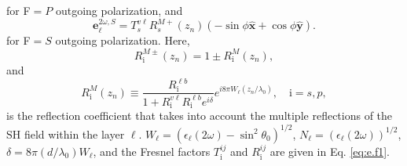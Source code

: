 \documentclass[utf8]{frontiersSCNS}
\begin{document}
for F$=P$ outgoing polarization, and
\begin{equation}\label{eq:e2wsmrn}
\mathbf{e}^{2\omega,S}_{\ell} =
T_{s}^{v\ell}R^{M+}_{s}(z_{n})
\left(
- \sin\phi\mathbf{\hat{x}}
+ \cos\phi\mathbf{\hat{y}}
\right). 
\end{equation}
for F$=S$ outgoing polarization. Here,
\begin{equation}\label{eq:n1}
R^{M\pm}_{\mathrm{i}}(z_{n}) = 1\pm R^{M}_{\mathrm{i}}(z_{n}),
\end{equation}
and
\begin{equation}\label{m61n} 
R^{M}_{\mathrm{i}}(z_{n}) \equiv
\frac{R^{\ell b}_{\mathrm{i}}}
     {1+R^{v\ell}_{\mathrm{i}} R^{\ell b}_{\mathrm{i}}e^{i\delta}} 
e^{i8\pi W_{\ell}(z_{n}/\lambda_{0})}, \quad \mathrm{i}=s,p,
\end{equation} 
is the reflection coefficient that takes into account the multiple reflections
of the SH field within the layer $\ell$. $W_{\ell}=(\epsilon_{\ell}(2\omega) -
\sin^{2}\theta_{0})^{1/2}$, $N_{\ell} = (\epsilon_{\ell}(2\omega))^{1/2}$,
$\delta = 8\pi(d/\lambda_{0})W_{\ell}$, and the Fresnel factors
$T^{ij}_{\mathrm{i}}$ and $R^{ij}_{\mathrm{i}}$ are given in Eq.
\eqref{eq:e.f1}.
\end{document}

